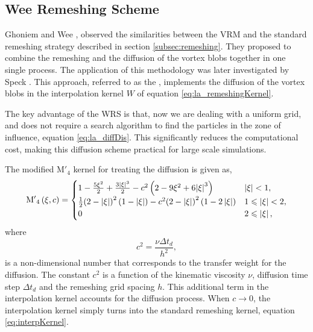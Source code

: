 \subsection{Wee Remeshing Scheme}
\label{subsec:modifiedRemeshing}

Ghoniem and Wee \cite{Wee2006a}, observed the similarities between the VRM and the standard remeshing strategy described in section \ref{subsec:remeshing}. They proposed to combine the remeshing and the diffusion of the vortex blobs together in one single process. The application of this methodology was later investigated by Speck \cite{Speck2011a}. This approach, referred to as the , implements the diffusion of the vortex blobs in the interpolation kernel $W$ of equation \ref{eq:la_remeshingKernel}.

The key advantage of the WRS is that, now we are dealing with a uniform grid, and does not require a search algorithm to find the particles in the zone of influence, equation \ref{eq:la_diffDis}. This significantly reduces the computational cost, making this diffusion scheme practical for large scale simulations. 

The modified $\mathrm{M'}_4$ kernel for treating the diffusion is given as,
	\begin{equation}
	{{{\rm{M'}}}_4}\left( {\xi ,c} \right) =
	  \begin{cases}
	   {1 - \frac{{5{\xi ^2}}}{2} + \frac{{3{{\left| \xi  \right|}^3}}}{2} - {c^2}\left( {2 - 9{\xi ^2} + 6{{\left| \xi  \right|}^3}} \right)} & {\left| \xi \right|} < 1, \\
	   \frac{1}{2}{\left( {2 - \left| \xi  \right|} \right)^2}\left( {1 - \left| \xi  \right|} \right) - {c^2}{\left( {2 - \left| \xi  \right|} \right)^2}\left( {1 - 2\left| \xi  \right|} \right) & 1 \leqslant {\left| \xi \right|} < 2,\\
	   0 & 2 \leqslant \left| \xi \right|,
	  \end{cases}
	\label{eq:modInterpKernel}
	\end{equation}
where 
	\begin{equation}
	c^2 = \frac{\nu \Delta t_d}{h^2},
	\label{eq:c2}
	\end{equation}
is a non-dimensional number that corresponds to the transfer weight for the diffusion. The constant $c^2$ is a function of the kinematic viscosity $\nu$, diffusion time step $\Delta t_d$ and the remeshing grid spacing $h$. This additional term in the interpolation kernel accounts for the diffusion process. When $c \rightarrow 0$, the interpolation kernel simply turns into the standard remeshing kernel, equation \ref{eq:interpKernel}. 

